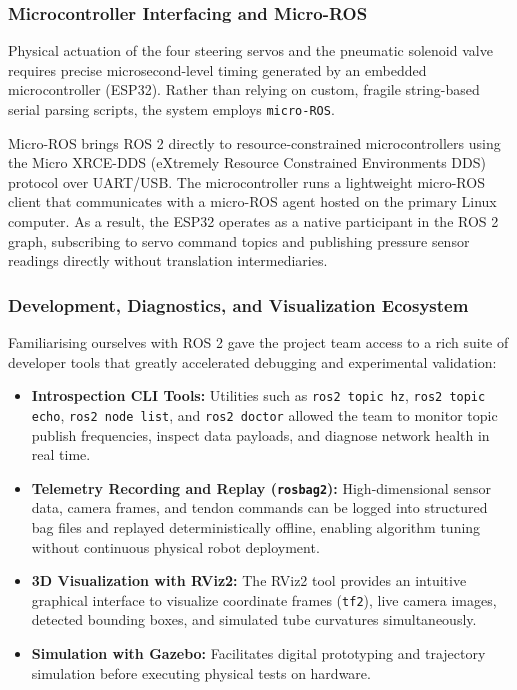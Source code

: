 \subsubsection{Microcontroller Interfacing and Micro-ROS}
Physical actuation of the four steering servos and the pneumatic solenoid valve requires precise microsecond-level timing generated by an embedded microcontroller (ESP32). Rather than relying on custom, fragile string-based serial parsing scripts, the system employs \texttt{micro-ROS}. 

Micro-ROS brings ROS 2 directly to resource-constrained microcontrollers using the Micro XRCE-DDS (eXtremely Resource Constrained Environments DDS) protocol over UART/USB. The microcontroller runs a lightweight micro-ROS client that communicates with a micro-ROS agent hosted on the primary Linux computer. As a result, the ESP32 operates as a native participant in the ROS 2 graph, subscribing to servo command topics and publishing pressure sensor readings directly without translation intermediaries.

\subsubsection{Development, Diagnostics, and Visualization Ecosystem}
Familiarising ourselves with ROS 2 gave the project team access to a rich suite of developer tools that greatly accelerated debugging and experimental validation:

\begin{itemize}
    \item \textbf{Introspection CLI Tools:} Utilities such as \texttt{ros2 topic hz}, \texttt{ros2 topic echo}, \texttt{ros2 node list}, and \texttt{ros2 doctor} allowed the team to monitor topic publish frequencies, inspect data payloads, and diagnose network health in real time.
    \item \textbf{Telemetry Recording and Replay (\texttt{rosbag2}):} High-dimensional sensor data, camera frames, and tendon commands can be logged into structured bag files and replayed deterministically offline, enabling algorithm tuning without continuous physical robot deployment.
    \item \textbf{3D Visualization with RViz2:} The RViz2 tool provides an intuitive graphical interface to visualize coordinate frames (\texttt{tf2}), live camera images, detected bounding boxes, and simulated tube curvatures simultaneously.
    \item \textbf{Simulation with Gazebo:} Facilitates digital prototyping and trajectory simulation before executing physical tests on hardware.
\end{itemize}


